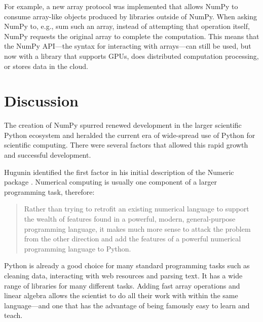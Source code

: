 
For example, a new array protocol was implemented that allows NumPy to consume
array-like objects produced by libraries outside of NumPy.  When asking NumPy
to, e.g., sum such an array, instead of attempting that operation itself, NumPy
requests the original array to complete the computation.  This means that the
NumPy API---the syntax for interacting with arrays---can still be used, but now
with a library that supports GPUs, does distributed computation processing, or
stores data in the cloud.

\section*{Discussion}



The creation of NumPy spurred renewed development in the larger scientific
Python ecosystem and heralded the current era of wide-spread use of Python for
scientific computing.
There were several factors that allowed this rapid growth
and successful development.

Hugunin identified the first factor in his initial description of the Numeric
package \cite{Hugunin-whitepaper}.  Numerical computing is usually one
component of a larger programming task, therefore:
\begin{quote}
    Rather than trying to retrofit an existing numerical language to support
    the wealth of features found in a powerful, modern, general-purpose
    programming language, it makes much more sense to attack the problem from
    the other direction and add the features of a powerful numerical
    programming language to Python.
\end{quote}
Python is already a good choice for many standard programming tasks such as
cleaning data, interacting with web resources and parsing text.  It has a wide
range of libraries for many different tasks. Adding fast array operations and
linear algebra allows the scientist to do all their work with within the same
language---and one that has the advantage of being famously easy to learn and
teach.

